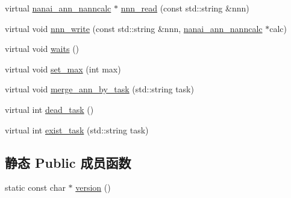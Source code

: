 \begin{DoxyCompactItemize}
\item 
virtual \hyperlink{classnanai_1_1nanai__ann__nanncalc}{nanai\+\_\+ann\+\_\+nanncalc} $\ast$ \hyperlink{classnanai_1_1nanai__ann__nannmgr_aa4bf6ea43af41a463213c1620757685a}{nnn\+\_\+read} (const std\+::string \&nnn)
\item 
virtual void \hyperlink{classnanai_1_1nanai__ann__nannmgr_a04ac84eff31dab37e338807a4d44d0b9}{nnn\+\_\+write} (const std\+::string \&nnn, \hyperlink{classnanai_1_1nanai__ann__nanncalc}{nanai\+\_\+ann\+\_\+nanncalc} $\ast$calc)
\item 
virtual void \hyperlink{classnanai_1_1nanai__ann__nannmgr_a41e95105ae57bf782fb5ad3b517c4a6a}{waits} ()
\item 
virtual void \hyperlink{classnanai_1_1nanai__ann__nannmgr_ae0a3866bf95574f3d12543da7a326b08}{set\+\_\+max} (int max)
\item 
virtual void \hyperlink{classnanai_1_1nanai__ann__nannmgr_a892c55b5c4a4b22dfd738c1227476ab0}{merge\+\_\+ann\+\_\+by\+\_\+task} (std\+::string task)
\item 
virtual int \hyperlink{classnanai_1_1nanai__ann__nannmgr_a5e88711b173c6074539af3a1b32e761d}{dead\+\_\+task} ()
\item 
virtual int \hyperlink{classnanai_1_1nanai__ann__nannmgr_a1cc1df92755308a610a78c1f16e602c0}{exist\+\_\+task} (std\+::string task)
\end{DoxyCompactItemize}
\subsection*{静态 Public 成员函数}
\begin{DoxyCompactItemize}
\item 
static const char $\ast$ \hyperlink{classnanai_1_1nanai__ann__nannmgr_a94024506784918f4808bbe28c4721335}{version} ()
\end{DoxyCompactItemize}
